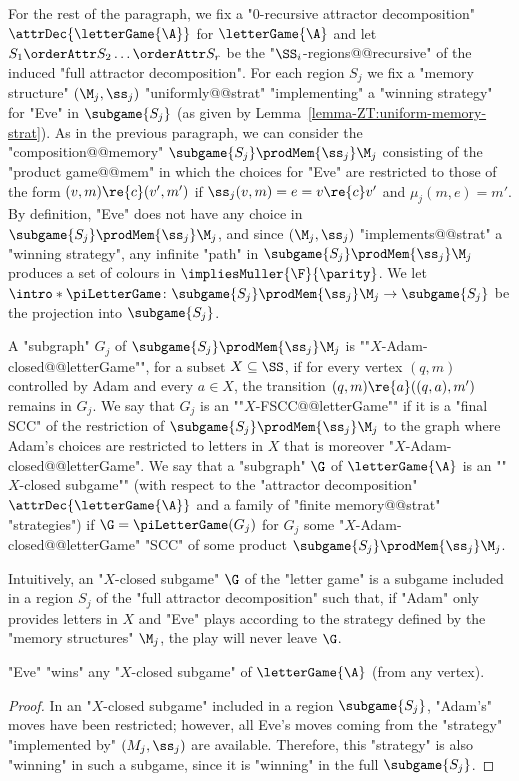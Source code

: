 \documentclass{theoretics}
\begin{document}
For the rest of the paragraph, we fix a "$0$-recursive attractor decomposition" $\attrDec{\letterGame{\A}}$ for $\letterGame{\A}$ and let $S_1 \orderAttr S_2 \dots \orderAttr S_r$ be the "$\SS_i$-regions@@recursive" of the induced "full attractor decomposition".
For each region $S_j$ we fix a "memory structure" $(\M_j, \ss_j)$ "uniformly@@strat" "implementing" a "winning strategy" for "Eve" in $\subgame{S_j}$  (as given by Lemma~\ref{lemma-ZT:uniform-memory-strat}).
As in the previous paragraph, we can consider the "composition@@memory" $\subgame{S_j} \prodMem{\ss_j} \M_j$ consisting of the "product game@@mem" in which the choices for "Eve" are restricted to those of the form 
$(v,m) \re{c} (v',m')$ if  $\ss_j(v,m) =  e = v\re{c} v'$ and $\mu_j(m,e) = m'$. 
By definition, "Eve" does not have any choice in $\subgame{S_j} \prodMem{\ss_j} \M_j$, and since $(\M_j, \ss_j)$ "implements@@strat" a "winning strategy", any infinite "path" in $\subgame{S_j} \prodMem{\ss_j} \M_j$ produces a set of colours in $\impliesMuller{\F}{\parity}$.
\AP We let $\intro*\piLetterGame\colon \subgame{S_j} \prodMem{\ss_j} \M_j \to \subgame{S_j}$ be the projection into $\subgame{S_j}$.


\AP A "subgraph" $G_j$ of $\subgame{S_j} \prodMem{\ss_j} \M_j$ is ""$X$-Adam-closed@@letterGame"", for a subset $X\subseteq \SS$, if for every vertex $(q,m)$ controlled by Adam and every $a\in X$, the transition $(q,m)\re{a} ((q,a),m')$ remains in $G_j$. %
We say that $G_j$ is an ""$X$-FSCC@@letterGame"" if it is a "final SCC" of the restriction of $\subgame{S_j} \prodMem{\ss_j} \M_j$ to the graph where Adam's choices are restricted to letters in $X$ that is moreover "$X$-Adam-closed@@letterGame". 
\AP We say that a "subgraph" $\G$ of $\letterGame{\A}$ is an ""$X$-closed subgame"" (with respect to the "attractor decomposition" $\attrDec{\letterGame{\A}}$ and a family of "finite memory@@strat" "strategies")  if $\G = \piLetterGame(G_j)$ for $G_j$ some "$X$-Adam-closed@@letterGame" "SCC" of some product $\subgame{S_j} \prodMem{\ss_j} \M_j$.

Intuitively, an "$X$-closed subgame" $\G$ of the "letter game" is a subgame included in a region $S_j$ of the "full attractor decomposition"  such that, if "Adam" only provides letters in $X$ and "Eve" plays according to the strategy defined by the "memory structures" $\M_j$, the play will never leave $\G$. 

\begin{lemma}\label{lemma-ZT:Eve-wins-closed-subgames}
	"Eve" "wins" any "$X$-closed subgame" of $\letterGame{\A}$ (from any vertex).
\end{lemma}
\begin{proof}
	In an "$X$-closed subgame" included in a region $\subgame{S_j}$, "Adam's" moves have been restricted; however, all Eve's moves coming from the "strategy" "implemented by" $(M_j, \ss_j)$ are available. Therefore, this "strategy" is also "winning" in such a subgame, since it is "winning" in the full $\subgame{S_j}$.
\end{proof}
\end{document}
